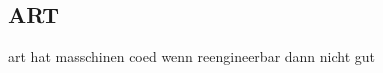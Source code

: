\subsection{ART}\label{subsection:external-art}
art hat masschinen coed\newline
wenn reengineerbar dann nicht gut
